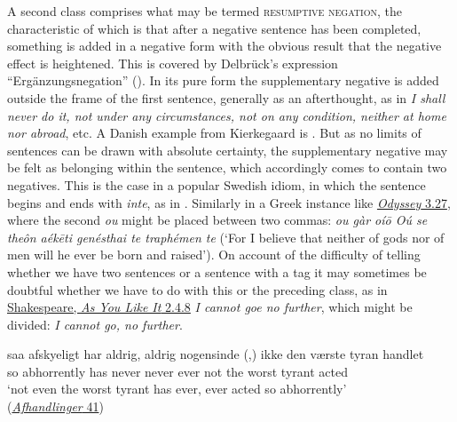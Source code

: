 A second class comprises what may be termed \textsc{resumptive negation}, the characteristic of which is that after a negative sentence has been completed, something is added in a negative form with the obvious result that the negative effect is heightened. This is covered by Delbrück's expression ``Ergänzungsnegation'' (\citeyear[\href{https://archive.org/details/grundrissderver01delbgoog/page/534/mode/2up?view=theater\&q=\%22erg\%C3\%A4nzungsnegation\%22}{\S177}]{delbruck1897vergleichende}). In its pure form the supplementary negative is added outside the frame of the first sentence, generally as an afterthought, as in \textit{I shall never do it, not under any circumstances, not on any condition, neither at home nor abroad}, etc. A Danish example from Kierkegaard is . But as no limits of sentences can be drawn with absolute certainty, the supplementary negative may be felt as belonging within the sentence, which accordingly comes to contain two negatives. This is the case in a popular Swedish idiom, in which the sentence begins and ends with \textit{inte}, as in . Similarly in a Greek instance like \href{https://archive.org/details/homer-odyssey-loeb_202404/page/n85/mode/2up?q=%22+%CE%BF%E1%BD%90+%CE%B3%E1%BD%B0%CF%81+%E1%BD%80%CE%AF%CF%89+%CE%BF%E1%BD%94+%CF%83%CE%B5+%CE%B8%CE%B5%E1%BF%B6%CE%BD+%E1%BD%81+%E1%BC%80%CE%AD%CE%BA%CE%B7%CF%84%CE%B9+%CE%B3%CE%B5%CE%BD%CE%AD%CF%83%CE%B8%CE%B1%CE%B9+%CF%84%CE%B5+%CF%84%CF%81%CE%B1%CF%86%CE%AD%CE%BC%CE%B5%CE%BD%22}{\textit{Odyssey} 3.27}, where the second \textit{ou} might be placed between two commas: \textit{ou gàr oíō Oú se theôn aékēti genésthai te traphémen te} (`For I believe that neither of gods nor of men will he ever be born and raised'). On account of the difficulty of telling whether we have two sentences or a sentence with a tag it may sometimes be doubtful whether we have to do with this or the preceding class, as in \href{https://internetshakespeare.uvic.ca/doc/AYL_F1/scene/2.4/index.html#tln-790}{Shakespeare, \textit{As You Like It} 2.4.8} \textit{I cannot goe no further}, which might be divided: \textit{I cannot go, no further}. 

\ea \label{ex:07-37}
\gll saa afskyeligt har aldrig, aldrig {nogensinde} (,) ikke den værste tyran handlet\\
 so abhorrently has never never ever {} not the worst tyrant acted\\
\glt `not even the worst tyrant has ever, ever acted so abhorrently'\\\hfill(\href{https://tekster.kb.dk/text/sks-tsa-txt-root#ss80}{\textit{Afhandlinger} 41}) %
\z
{}

